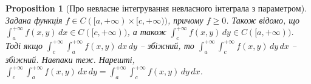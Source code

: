 \documentclass[a4paper, 10pt]{article}
\def\huge{\displaystyle}
\theoremstyle{theoremdd}
\theoremstyle{theoremdd}
\theoremstyle{theoremdd}
\theoremstyle{theoremdd}
\theoremstyle{theoremdd}
\theoremstyle{theoremdd}
\newtheorem{proposition}[theorem]{Proposition}
\theoremstyle{theoremdd}
\theoremstyle{theoremdd}
\theoremstyle{theoremdd}
\begin{document}
\begin{proposition}[Про невласне інтегрування невласного інтеграла з параметром]
\iffalse
Задана функція $f: [a, +\infty) \times [c, +\infty) \to \mathbb{R}$ така, що $f \in C([a, +\infty) \times [c, +\infty))$, а також виконані умови:\\
$1) \forall b > a: \huge \int_c^{+\infty} f(x,y)\,dy$ - збіжний рівномірно в $[a,b]$\\
$2) \forall d > c: \huge \int_a^{+\infty} f(x,y)\,dx$ - збіжний рівномірно в $[c,d]$\\
$3) \huge \int_c^{+\infty} |f(x,y)|\,dy, \huge \int_a^{+\infty} |f(x,y)|\,dx$ - збігаються $\forall x \geq a, \forall y \geq c$\\
$4) \huge \int_a^{+\infty} \int_c^{+\infty} |f(x,y)|\,dy\,dx$ або $\huge \int_c^{+\infty} \int_a^{+\infty} |f(x,y)|\,dx\,dy$ - збіжний\\
Тоді обидва інтеграли - збіжні та \\ $\huge \int_a^{+\infty} \int_c^{+\infty} |f(x,y)|\,dy\,dx  = \huge \int_c^{+\infty} \int_a^{+\infty} |f(x,y)|\,dx\,dy$\\
\textit{Поки без доведення}
\bigskip \\
\fi
Задана функція $f \in C([a,+\infty) \times [c,+\infty))$, причому $f \geq 0$. Також відомо, що $\huge\int_a^{+\infty} f(x,y)\,dx \in C([c,+\infty))$, а також $\huge\int_c^{+\infty} f(x,y)\,dy \in C([a,+\infty))$. Тоді якщо $\huge\int_c^{+\infty} \int_a^{+\infty} f(x,y)\,dx\,dy$ -- збіжний, то $\huge\int_a^{+\infty} \int_c^{+\infty} f(x,y)\,dy\,dx$ -- збіжний. Навпаки теж. Нарешті,\\
$\huge\int_c^{+\infty} \int_a^{+\infty} f(x,y)\,dx\,dy = \huge\int_a^{+\infty} \int_c^{+\infty} f(x,y)\,dy\,dx$.
\end{proposition}
\end{document}
